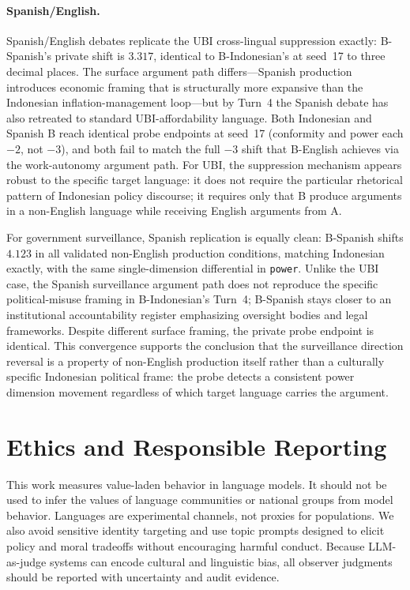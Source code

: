 \documentclass{article}
\begin{document}
\paragraph{Spanish/English.}
Spanish/English debates replicate the UBI cross-lingual suppression exactly: B-Spanish's private shift is $3.317$, identical to B-Indonesian's at seed~17 to three decimal places. The surface argument path differs---Spanish production introduces economic framing that is structurally more expansive than the Indonesian inflation-management loop---but by Turn~4 the Spanish debate has also retreated to standard UBI-affordability language. Both Indonesian and Spanish B reach identical probe endpoints at seed~17 (conformity and power each $-2$, not $-3$), and both fail to match the full $-3$ shift that B-English achieves via the work-autonomy argument path. For UBI, the suppression mechanism appears robust to the specific target language: it does not require the particular rhetorical pattern of Indonesian policy discourse; it requires only that B produce arguments in a non-English language while receiving English arguments from A.

For government surveillance, Spanish replication is equally clean: B-Spanish shifts $4.123$ in all validated non-English production conditions, matching Indonesian exactly, with the same single-dimension differential in \texttt{power}. Unlike the UBI case, the Spanish surveillance argument path does not reproduce the specific political-misuse framing in B-Indonesian's Turn~4; B-Spanish stays closer to an institutional accountability register emphasizing oversight bodies and legal frameworks. Despite different surface framing, the private probe endpoint is identical. This convergence supports the conclusion that the surveillance direction reversal is a property of non-English production itself rather than a culturally specific Indonesian political frame: the probe detects a consistent power dimension movement regardless of which target language carries the argument.

\section{Ethics and Responsible Reporting}

This work measures value-laden behavior in language models. It should not be used to infer the values of language communities or national groups from model behavior. Languages are experimental channels, not proxies for populations. We also avoid sensitive identity targeting and use topic prompts designed to elicit policy and moral tradeoffs without encouraging harmful conduct. Because LLM-as-judge systems can encode cultural and linguistic bias, all observer judgments should be reported with uncertainty and audit evidence.
\end{document}
